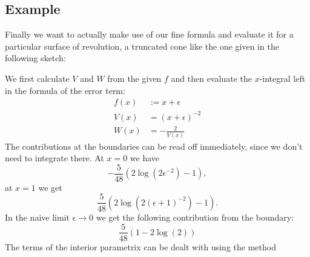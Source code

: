 \subsection{Example}
Finally we want to actually make use of our fine formula and evaluate it for a
particular surface of revolution, a truncated cone like the one given in the
following sketch:
\begin{center}
\end{center}
We first calculate $V$ and $W$ from the given $f$ and then evaluate the
$x$-integral left in the formula of the error term:
\begin{equation}
  \begin{split}
    f(x) &:= x + \epsilon \\
    V(x) &= (x + \epsilon)^{-2} \\
    W(x) &= -\frac 2{V(x)}
  \end{split}
\end{equation}
The contributions at the boundaries can be read off immediately, since we don't
need to integrate there. At $x=0$ we have
\begin{equation}
  \label{res:boundary0}
  -\frac{5}{48}(2\log(2\epsilon^{-2}) - 1),
\end{equation}
at $x=1$ we get
\begin{equation}
  \label{res:boundary1}
  \frac{5}{48}(2\log(2(\epsilon + 1)^{-2}) -1).
\end{equation}
In the naive limit $\epsilon\to0$ we get the following contribution from the
boundary:
\begin{equation*}
  \frac{5}{48}(1-2\log(2))
\end{equation*}
The terms of the interior parametrix can be dealt with using the method
